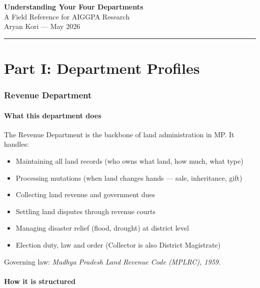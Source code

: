 \documentclass[11pt,a4paper]{article}
\begin{document}
\begin{center}
{\LARGE\bfseries Understanding Your Four Departments}\\[6pt]
{\large A Field Reference for AIGGPA Research}\\[4pt]
{\small Aryan Kori --- May 2026}
\end{center}
\vspace{6pt}\hrule\vspace{12pt}

\tableofcontents
\newpage

\part*{Part I: Department Profiles}

\section{Revenue Department}

\subsection{What this department does}

The Revenue Department is the backbone of land administration in MP. It handles:
\begin{itemize}[nosep]
  \item Maintaining all land records (who owns what land, how much, what type)
  \item Processing mutations (when land changes hands --- sale, inheritance, gift)
  \item Collecting land revenue and government dues
  \item Settling land disputes through revenue courts
  \item Managing disaster relief (flood, drought) at district level
  \item Election duty, law and order (Collector is also District Magistrate)
\end{itemize}

Governing law: \textit{Madhya Pradesh Land Revenue Code (MPLRC), 1959.}

\subsection{How it is structured}
\end{document}
